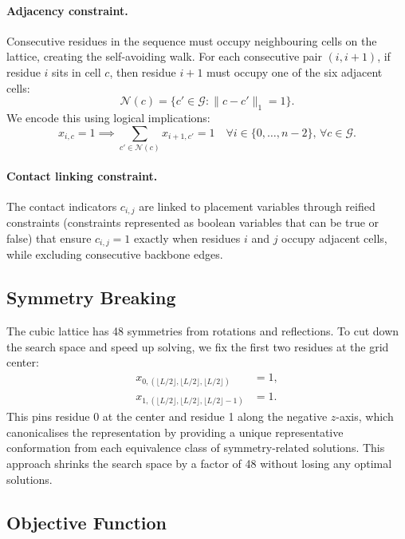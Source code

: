 \documentclass[12pt, oneside, openany]{book}
\theoremstyle{plain}
\theoremstyle{definition}
\begin{document}
\paragraph{Adjacency constraint.} Consecutive residues in the sequence must occupy neighbouring cells on the lattice, creating the self-avoiding walk. For each consecutive pair $(i, i+1)$, if residue $i$ sits in cell $c$, then residue $i+1$ must occupy one of the six adjacent cells:
\begin{equation}
\mathcal{N}(c) = \{c' \in \mathcal{G} : \|c - c'\|_1 = 1\}.
\end{equation}
We encode this using logical implications:
\begin{equation}
x_{i,c} = 1 \implies \sum_{c' \in \mathcal{N}(c)} x_{i+1,c'} = 1 \quad \forall i \in \{0, \ldots, n-2\}, \, \forall c \in \mathcal{G}.
\end{equation}

\paragraph{Contact linking constraint.} The contact indicators $c_{i,j}$ are linked to placement variables through reified constraints (constraints represented as boolean variables that can be true or false) that ensure $c_{i,j} = 1$ exactly when residues $i$ and $j$ occupy adjacent cells, while excluding consecutive backbone edges.

\subsection{Symmetry Breaking}

The cubic lattice has 48 symmetries from rotations and reflections. To cut down the search space and speed up solving, we fix the first two residues at the grid center:
\begin{align}
x_{0, (\lfloor L/2 \rfloor, \lfloor L/2 \rfloor, \lfloor L/2 \rfloor)} &= 1, \\
x_{1, (\lfloor L/2 \rfloor, \lfloor L/2 \rfloor, \lfloor L/2 \rfloor - 1)} &= 1.
\end{align}
This pins residue 0 at the center and residue 1 along the negative $z$-axis, which canonicalises the representation by providing a unique representative conformation from each equivalence class of symmetry-related solutions. This approach shrinks the search space by a factor of 48 without losing any optimal solutions.

\subsection{Objective Function}
\end{document}
